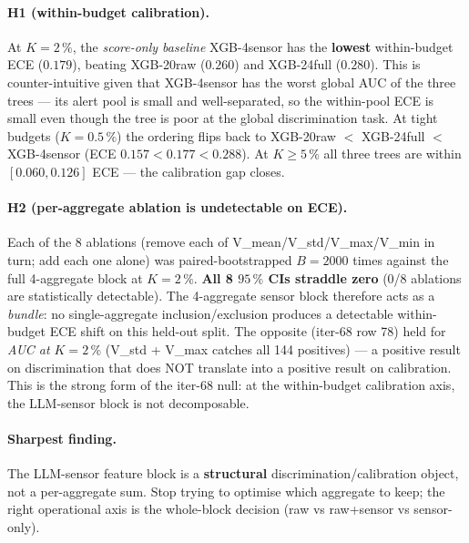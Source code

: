 \paragraph{H1 (within-budget calibration).}
At $K{=}2\,\%$, the \emph{score-only baseline} XGB-4sensor has the
\textbf{lowest} within-budget ECE ($0.179$), beating XGB-20raw
($0.260$) and XGB-24full ($0.280$). This is counter-intuitive given
that XGB-4sensor has the worst global AUC of the three trees ---
its alert pool is small and well-separated, so the within-pool
ECE is small even though the tree is poor at the global
discrimination task. At tight budgets ($K{=}0.5\,\%$) the ordering
flips back to XGB-20raw $<$ XGB-24full $<$ XGB-4sensor (ECE
$0.157 < 0.177 < 0.288$). At $K \geq 5\,\%$ all three trees are
within $[0.060, 0.126]$ ECE --- the calibration gap closes.

\paragraph{H2 (per-aggregate ablation is undetectable on ECE).}
Each of the 8 ablations (remove each of V\_mean/V\_std/V\_max/V\_min in
turn; add each one alone) was paired-bootstrapped $B{=}2000$ times
against the full 4-aggregate block at $K{=}2\,\%$. \textbf{All 8
$95\,\%$ CIs straddle zero} (0/8 ablations are statistically
detectable). The 4-aggregate sensor block therefore acts as a
\emph{bundle}: no single-aggregate inclusion/exclusion produces a
detectable within-budget ECE shift on this held-out split. The
opposite (iter-68 row 78) held for \emph{AUC at $K{=}2\,\%$}
(V\_std + V\_max catches all 144 positives) --- a positive result on
discrimination that does NOT translate into a positive result on
calibration. This is the strong form of the iter-68 null: at the
within-budget calibration axis, the LLM-sensor block is not
decomposable.

\paragraph{Sharpest finding.}
The LLM-sensor feature block is a \textbf{structural}
discrimination/calibration object, not a per-aggregate sum. Stop
trying to optimise which aggregate to keep; the right operational
axis is the whole-block decision (raw vs raw+sensor vs sensor-only).

